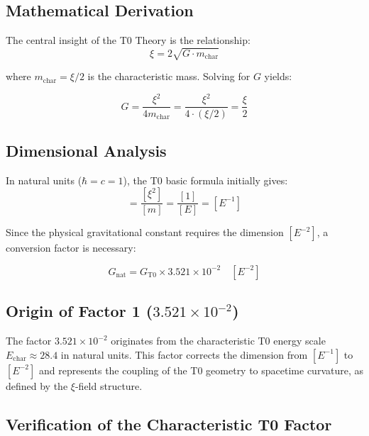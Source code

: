 \documentclass[11pt,a4paper]{article}
\begin{document}
	\subsection{Mathematical Derivation}
	
	The central insight of the T0 Theory is the relationship:
	\begin{equation}
		\xi = 2\sqrt{G \cdot m_{\text{char}}}
	\end{equation}
	
	where $m_{\text{char}} = \xi/2$ is the characteristic mass. Solving for $G$ yields:
	
	\begin{equation}
		\boxed{G = \frac{\xi^2}{4m_{\text{char}}} = \frac{\xi^2}{4 \cdot (\xi/2)} = \frac{\xi}{2}}
	\end{equation}
	
	\subsection{Dimensional Analysis}
	
	In natural units ($\hbar = c = 1$), the T0 basic formula initially gives:
	\begin{equation}
		[G_{\text{T0}}] = \frac{[\xi^2]}{[m]} = \frac{[1]}{[E]} = [E^{-1}]
	\end{equation}
	
	Since the physical gravitational constant requires the dimension $[E^{-2}]$, a conversion factor is necessary:
	
	\begin{equation}
		G_{\text{nat}} = G_{\text{T0}} \times 3{.}521 \times 10^{-2} \quad [E^{-2}]
	\end{equation}
	
	\subsection{Origin of Factor 1 ($3{.}521 \times 10^{-2}$)}
	
	The factor $3{.}521 \times 10^{-2}$ originates from the characteristic T0 energy scale $E_{\text{char}} \approx 28.4$ in natural units. This factor corrects the dimension from $[E^{-1}]$ to $[E^{-2}]$ and represents the coupling of the T0 geometry to spacetime curvature, as defined by the $\xi$-field structure.
	
	
	
	
	\subsection{Verification of the Characteristic T0 Factor}
	
\end{document}

